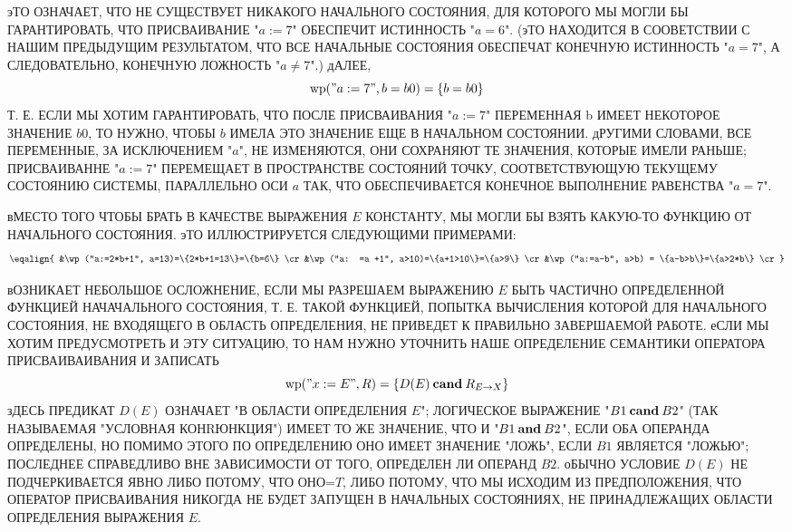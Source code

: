 эТО ОЗНАЧАЕТ, ЧТО НЕ СУЩЕСТВУЕТ НИКАКОГО НАЧАЛЬНОГО СОСТОЯНИЯ, ДЛЯ 
КОТОРОГО МЫ МОГЛИ БЫ ГАРАНТИРОВАТЬ, ЧТО ПРИСВАИВАНИЕ "$a:=7$" 
ОБЕСПЕЧИТ ИСТИННОСТЬ "$a=6$". (эТО НАХОДИТСЯ В СООВЕТСТВИИ С НАШИМ 
ПРЕДЫДУЩИМ РЕЗУЛЬТАТОМ, ЧТО ВСЕ НАЧАЛЬНЫЕ СОСТОЯНИЯ ОБЕСПЕЧАТ 
КОНЕЧНУЮ ИСТИННОСТЬ "$a=7$", А  СЛЕДОВАТЕЛЬНО, КОНЕЧНУЮ ЛОЖНОСТЬ 
"$a\not=7$".) дАЛЕЕ,
$$ 
\wp ("a:=7", b=b0)=\{b=b0\}
$$
Т. Е. ЕСЛИ МЫ ХОТИМ ГАРАНТИРОВАТЬ, ЧТО ПОСЛЕ ПРИСВАИВАНИЯ "$a:=7$" 
ПЕРЕМЕННАЯ b ИМЕЕТ НЕКОТОРОЕ ЗНАЧЕНИЕ $b0$, ТО НУЖНО, ЧТОБЫ $b$ ИМЕЛА 
ЭТО ЗНАЧЕНИЕ ЕЩЕ В НАЧАЛЬНОМ СОСТОЯНИИ. дРУГИМИ СЛОВАМИ, ВСЕ 
ПЕРЕМЕННЫЕ, ЗА ИСКЛЮЧЕНИЕМ "$a$", НЕ ИЗМЕНЯЮТСЯ, ОНИ СОХРАНЯЮТ ТЕ 
ЗНАЧЕНИЯ, КОТОРЫЕ ИМЕЛИ РАНЬШЕ; ПРИСВАИВАННЕ "$a:=7$" ПЕРЕМЕЩАЕТ В 
ПРОСТРАНСТВЕ СОСТОЯНИЙ ТОЧКУ, СООТВЕТСТВУЮЩУЮ ТЕКУЩЕМУ СОСТОЯНИЮ 
СИСТЕМЫ, ПАРАЛЛЕЛЬНО ОСИ $a$  ТАК, ЧТО ОБЕСПЕЧИВАЕТСЯ КОНЕЧНОЕ 
ВЫПОЛНЕНИЕ РАВЕНСТВА "$a=7$".

вМЕСТО ТОГО ЧТОБЫ БРАТЬ В КАЧЕСТВЕ ВЫРАЖЕНИЯ $E$ КОНСТАНТУ,  МЫ 
МОГЛИ БЫ ВЗЯТЬ КАКУЮ-ТО ФУНКЦИЮ ОТ НАЧАЛЬНОГО  СОСТОЯНИЯ. эТО 
ИЛЛЮСТРИРУЕТСЯ СЛЕДУЮЩИМИ ПРИМЕРАМИ:
$$ 
\eqalign{
&\wp("a:=2*b+1", a=13)=\{2*b+1=13\}=\{b=6\} \cr
&\wp ("a: =a +1", a>10)=\{a+1>10\}=\{a>9\} \cr
&\wp("a:=a-b", a>b) = \{a-b>b\}=\{a>2*b\} \cr
}
$$

вОЗНИКАЕТ НЕБОЛЬШОЕ ОСЛОЖНЕНИЕ, ЕСЛИ МЫ РАЗРЕШАЕМ ВЫРАЖЕНИЮ $E$ БЫТЬ 
ЧАСТИЧНО ОПРЕДЕЛЕННОЙ ФУНКЦИЕЙ НАЧАЧАЛЬНОГО СОСТОЯНИЯ, Т. Е. ТАКОЙ 
ФУНКЦИЕЙ, ПОПЫТКА ВЫЧИСЛЕНИЯ КОТОРОЙ ДЛЯ НАЧАЛЬНОГО СОСТОЯНИЯ, НЕ 
ВХОДЯЩЕГО В ОБЛАСТЬ ОПРЕДЕЛЕНИЯ, НЕ ПРИВЕДЕТ К ПРАВИЛЬНО ЗАВЕРШАЕМОЙ 
РАБОТЕ. еСЛИ МЫ ХОТИМ ПРЕДУСМОТРЕТЬ И ЭТУ СИТУАЦИЮ, ТО НАМ НУЖНО 
УТОЧНИТЬ НАШЕ ОПРЕДЕЛЕНИЕ СЕМАНТИКИ ОПЕРАТОРА ПРИСВАИВАИВАНИЯ И 
ЗАПИСАТЬ
$$ 
\wp ("x:=E", R) = \{D(E) \cand R_{E \to X}\} 
$$
зДЕСЬ ПРЕДИКАТ $D(E)$ ОЗНАЧАЕТ "В ОБЛАСТИ ОПРЕДЕЛЕНИЯ $E$"; 
ЛОГИЧЕСКОЕ ВЫРАЖЕНИЕ "$B1 \cand B2$" (ТАК НАЗЫВАЕМАЯ "УСЛОВНАЯ 
КОНRЮНКЦИЯ") ИМЕЕТ ТО ЖЕ ЗНАЧЕНИЕ, ЧТО И "$B1\and B2$", ЕСЛИ ОБА 
ОПЕРАНДА ОПРЕДЕЛЕНЫ, НО ПОМИМО ЭТОГО ПО ОПРЕДЕЛЕНИЮ ОНО ИМЕЕТ 
ЗНАЧЕНИЕ "ЛОЖЬ", ЕСЛИ $B1$ ЯВЛЯЕТСЯ "ЛОЖЬЮ"; ПОСЛЕДНЕЕ  СПРАВЕДЛИВО 
ВНЕ ЗАВИСИМОСТИ ОТ ТОГО, ОПРЕДЕЛЕН ЛИ ОПЕРАНД $B2$. оБЫЧНО УСЛОВИЕ 
$D(E)$ НЕ ПОДЧЕРКИВАЕТСЯ ЯВНО ЛИБО ПОТОМУ, ЧТО ОНО=$T$, ЛИБО ПОТОМУ, 
ЧТО МЫ ИСХОДИМ ИЗ ПРЕДПОЛОЖЕНИЯ, ЧТО ОПЕРАТОР ПРИСВАИВАНИЯ НИКОГДА 
НЕ БУДЕТ ЗАПУЩЕН В НАЧАЛЬНЫХ СОСТОЯНИЯХ, НЕ  ПРИНАДЛЕЖАЩИХ ОБЛАСТИ 
ОПРЕДЕЛЕНИЯ ВЫРАЖЕНИЯ $E$.

